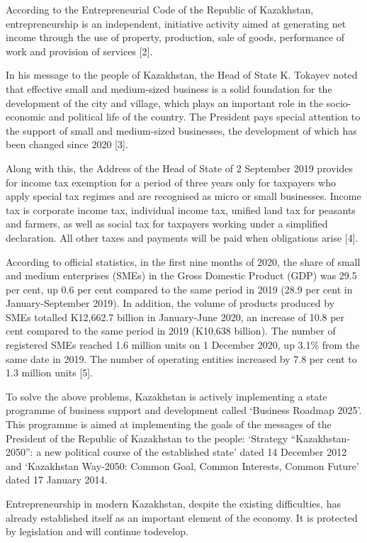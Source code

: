 \begin{multicols}{2}
According to the Entrepreneurial Code of the Republic of Kazakhstan,
entrepreneurship is an independent, initiative activity aimed at
generating net income through the use of property, production, sale of
goods, performance of work and provision of services {[}2{]}.

In his message to the people of Kazakhstan, the Head of State K. Tokayev
noted that effective small and medium-sized business is a solid
foundation for the development of the city and village, which plays an
important role in the socio-economic and political life of the country.
The President pays special attention to the support of small and
medium-sized businesses, the development of which has been changed since
2020 {[}3{]}.

Along with this, the Address of the Head of State of 2 September 2019
provides for income tax exemption for a period of three years only for
taxpayers who apply special tax regimes and are recognised as micro or
small businesses. Income tax is corporate income tax, individual income
tax, unified land tax for peasants and farmers, as well as social tax
for taxpayers working under a simplified declaration. All other taxes
and payments will be paid when obligations arise {[}4{]}.

According to official statistics, in the first nine months of 2020, the
share of small and medium enterprises (SMEs) in the Gross Domestic
Product (GDP) was 29.5 per cent, up 0.6 per cent compared to the same
period in 2019 (28.9 per cent in January-September 2019). In addition,
the volume of products produced by SMEs totalled K12,662.7 billion in
January-June 2020, an increase of 10.8 per cent compared to the same
period in 2019 (K10,638 billion). The number of registered SMEs reached
1.6 million units on 1 December 2020, up 3.1\% from the same date in
2019. The number of operating entities increased by 7.8 per cent to 1.3
million units {[}5{]}.

To solve the above problems, Kazakhstan is actively implementing a state
programme of business support and development called `Business Roadmap
2025'. This programme is aimed at implementing the goals of the messages
of the President of the Republic of Kazakhstan to the people: `Strategy
``Kazakhstan-2050'': a new political course of the established state'
dated 14 December 2012 and `Kazakhstan Way-2050: Common Goal, Common
Interests, Common Future' dated 17 January 2014.

Entrepreneurship in modern Kazakhstan, despite the existing
difficulties, has already established itself as an important element of
the economy. It is protected by legislation and will continue todevelop.
\end{multicols}

